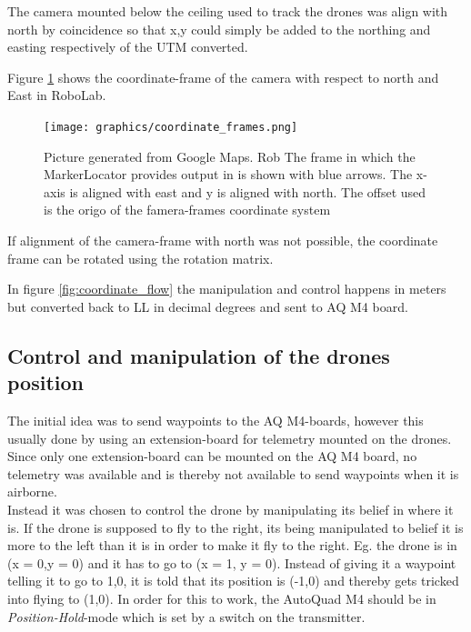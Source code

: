 The camera mounted below the ceiling used to track the drones was align with north by coincidence so that x,y could simply be added to the northing and easting respectively of the \ac{UTM} converted.

Figure \ref{fig:coordinate_frames} shows the coordinate-frame of the camera with respect to north and East in RoboLab.

\begin{figure}[H]
    \center
    \texttt{[image: graphics/coordinate\_frames.png]}
  	\caption{Picture generated from Google Maps. Rob The frame in which the MarkerLocator provides output in is shown with blue arrows. The x-axis is aligned with east and y is aligned with north. The offset used is the origo of the famera-frames coordinate system}
    \label{fig:coordinate_frames}
\end{figure}

If alignment of the camera-frame with north was not possible, the coordinate frame can be rotated using the rotation matrix\cite{Choset_2005_5167}.

In figure \ref{fig:coordinate_flow} the manipulation and control happens in meters but converted back to \ac{LL} in decimal degrees and sent to AQ M4 board.

\subsection{Control and manipulation of the drones position}
The initial idea was to send waypoints to the AQ M4-boards, however this usually done by using an extension-board for telemetry mounted on the drones. Since only one extension-board can be mounted on the AQ M4 board, no telemetry was available and is thereby not available to send waypoints when it is airborne. \\
Instead it was chosen to control the drone by manipulating its belief in where it is.
If the drone is supposed to fly to the right, its being manipulated to belief it is more to the left than it is in order to make it fly to the right. Eg. the drone is in (x = 0,y = 0) and it has to go to (x = 1, y = 0).
Instead of giving it a waypoint telling it to go to 1,0, it is told that its position is (-1,0) and thereby gets tricked into flying to (1,0). In order for this to work, the AutoQuad M4 should be in \textit{Position-Hold}-mode which is set by a switch on the transmitter.

